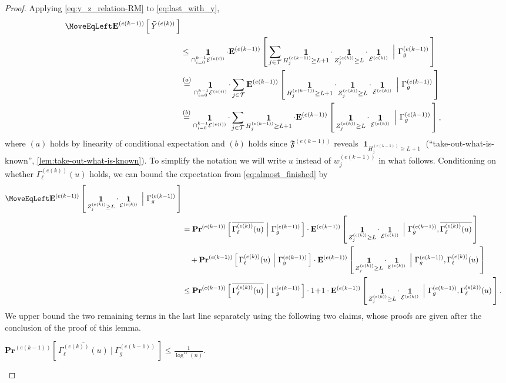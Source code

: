 \documentclass[twoside,leqno]{article}
\newcommand{\cond}{\ensuremath{ ~\Big|~ }}
\newcommand{\Exf}[2]{\mathbf{E}^{(#1)}\left[\,#2\,\right]}
\newcommand{\Prof}[2]{\mathbf{Pr}^{(#1)}\left[\,#2\,\right]}
\DeclareMathOperator{\1}{\mathbf{1}}
\numberwithin{equation}{section}
\newcommand{\newL}{L}
\begin{document}
\begin{proof}
Applying \cref{eq:y_z_relation-RM} to \cref{eq:last_with_y},
\begin{align}
\MoveEqLeft \Exf{e(k-1)}{ \tilde{Y}^{(e(k))} } \notag \\
&\leq \1_{\cap_{i=0}^{k-1} \mathcal{E}^{(e(i))}} \cdot \Exf{e(k-1)}{ \sum_{j \in \mathcal{T}} \1_{H_j^{(e(k-1))} \geq \newL+1} \cdot \1_{Z_j^{(e(k))}\ge \newL} \cdot
\1_{ \mathcal{E}^{(e(k))} }~\Big|~   \Gamma_g^{(e(k-1))} } \notag \\
&\stackrel{(a)}{=}
\1_{\cap_{i=0}^{k-1} \mathcal{E}^{(e(i))}} \cdot \sum_{j \in \mathcal{T}} \Exf{e(k-1)}{ \1_{H_j^{(e(k-1))} \geq \newL+1} \cdot \1_{Z_j^{(e(k))}\ge \newL} \cdot
\1_{ \mathcal{E}^{(e(k))} }~\Big|~   \Gamma_g^{(e(k-1))} } \notag
\\
&\stackrel{(b)}{=} \1_{\cap_{i=0}^{k-1} \mathcal{E}^{(e(i))}} \cdot \sum_{j \in \mathcal{T}} \1_{H_j^{(e(k-1))} \geq \newL+1} \cdot \Exf{e(k-1)}{ \1_{Z_j^{(e(k))}\ge \newL} \cdot
\1_{ \mathcal{E}^{(e(k))} }~\Big|~   \Gamma_g^{(e(k-1))} }, \label{eq:almost_finished}
\end{align}
where $(a)$ holds by linearity of conditional expectation and $(b)$ holds since $\mathfrak{F}^{(e(k-1))}$ reveals $\1_{H_j^{(e(k-1))}\ge \newL+1}$ (``take-out-what-is-known'', \cref{lem:take-out-what-is-known}).
To simplify the notation we will write $u$ instead of $w_j^{(e(k-1))}$ in what follows.
Conditioning on whether $\Gamma_{\ell}^{(e(k))}(u)$ holds, we can bound the expectation from \cref{eq:almost_finished} by
\begin{align*}
\MoveEqLeft \Exf{e(k-1)}{ \1_{Z_{j}^{(e(k))}\ge \newL} \cdot
\1_{\mathcal{E}^{(e(k))}} \cond  \Gamma_g^{(e(k-1))} } \\
&= \Prof{e(k-1)}{ \overline{\Gamma_{\ell}^{(e(k))}(u)} ~\Big|~ \Gamma_g^{(e(k-1))}} \cdot \Exf{e(k-1)}{ \1_{Z_{j}^{(e(k))}\ge \newL} \cdot
\1_{\mathcal{E}^{(e(k))}} ~\Big|~  \Gamma_g^{(e(k-1))}, \overline{ \Gamma_{\ell}^{(e(k))}(u)} } \\
&\quad + \Prof{e(k-1)}{ \Gamma_{\ell}^{(e(k))}(u) ~\Big|~ \Gamma_g^{(e(k-1))}} \cdot \Exf{e(k-1)}{ \1_{Z_{j}^{(e(k))}\ge \newL} \cdot
\1_{\mathcal{E}^{(e(k))}} ~\Big|~  \Gamma_g^{(e(k-1))}, \Gamma_{\ell}^{(e(k))}(u) } \\
&\leq \Prof{e(k-1)}{ \overline{\Gamma_{\ell}^{(e(k))}(u)} ~\Big|~ \Gamma_g^{(e(k-1))}} \cdot 1 \!+\! 
1 \cdot \Exf{e(k-1)}{ \1_{Z_{j}^{(e(k))}\ge \newL} \cdot
\1_{\mathcal{E}^{(e(k))}} ~\Big|~  \Gamma_g^{(e(k-1))}, \Gamma_{\ell}^{(e(k))}(u) }  .
\end{align*}
We upper bound the two remaining terms in the last line separately using the following two claims, whose proofs are given after the conclusion of the proof of this lemma.
\begin{claim}\label{clm:abcd_one}
$\displaystyle\Prof{e(k-1)}{ \overline{\Gamma_{\ell}^{(e(k))}(u)} ~\Big|~ \Gamma_g^{(e(k-1))}}
\leq
\frac{1}{\log^{11} (n) }
$.
\end{claim}


\end{proof}
\end{document}
